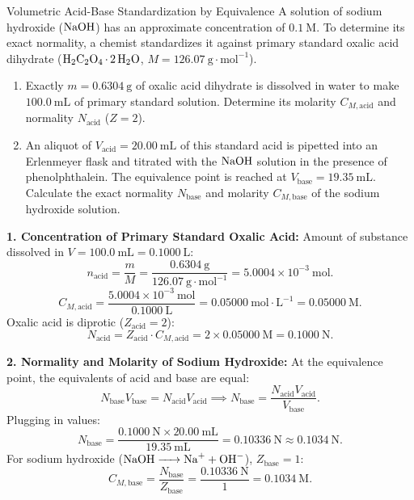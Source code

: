 \begin{exercise}{Volumetric Acid-Base Standardization by Equivalence}
A solution of sodium hydroxide ($\ce{NaOH}$) has an approximate concentration of $0.1\ \mathrm{M}$. To determine its exact normality, a chemist standardizes it against primary standard oxalic acid dihydrate ($\ce{H2C2O4*2H2O}$, $M = 126.07\ \mathrm{g\cdot mol^{-1}}$).
\begin{enumerate}[leftmargin=1.5em,itemsep=2pt]
  \item Exactly $m = 0.6304\ \mathrm{g}$ of oxalic acid dihydrate is dissolved in water to make $100.0\ \mathrm{mL}$ of primary standard solution. Determine its molarity $C_{M,\text{acid}}$ and normality $N_{\text{acid}}$ ($Z=2$).
  \item An aliquot of $V_{\text{acid}} = 20.00\ \mathrm{mL}$ of this standard acid is pipetted into an Erlenmeyer flask and titrated with the $\ce{NaOH}$ solution in the presence of phenolphthalein. The equivalence point is reached at $V_{\text{base}} = 19.35\ \mathrm{mL}$. Calculate the exact normality $N_{\text{base}}$ and molarity $C_{M,\text{base}}$ of the sodium hydroxide solution.
\end{enumerate}
\end{exercise}

\begin{tabletworkspace}[5.0cm]
\end{tabletworkspace}

\begin{solution}
\textbf{1. Concentration of Primary Standard Oxalic Acid:}
Amount of substance dissolved in $V = 100.0\ \mathrm{mL} = 0.1000\ \mathrm{L}$:
\[
n_{\text{acid}} = \frac{m}{M} = \frac{0.6304\ \mathrm{g}}{126.07\ \mathrm{g\cdot mol^{-1}}} = 5.0004 \times 10^{-3}\ \mathrm{mol}.
\]
\[
C_{M,\text{acid}} = \frac{5.0004 \times 10^{-3}\ \mathrm{mol}}{0.1000\ \mathrm{L}} = \mathbf{0.05000\ \mathrm{mol\cdot L^{-1}} = 0.05000\ \mathrm{M}}.
\]
Oxalic acid is diprotic ($Z_{\text{acid}} = 2$):
\[
N_{\text{acid}} = Z_{\text{acid}} \cdot C_{M,\text{acid}} = 2 \times 0.05000\ \mathrm{M} = \mathbf{0.1000\ \mathrm{N}}.
\]

\textbf{2. Normality and Molarity of Sodium Hydroxide:}
At the equivalence point, the equivalents of acid and base are equal:
\[
N_{\text{base}} V_{\text{base}} = N_{\text{acid}} V_{\text{acid}} \implies N_{\text{base}} = \frac{N_{\text{acid}} V_{\text{acid}}}{V_{\text{base}}}.
\]
Plugging in values:
\[
N_{\text{base}} = \frac{0.1000\ \mathrm{N} \times 20.00\ \mathrm{mL}}{19.35\ \mathrm{mL}} = \mathbf{0.10336\ \mathrm{N} \approx 0.1034\ \mathrm{N}}.
\]
For sodium hydroxide ($\ce{NaOH -> Na+ + OH-}$), $Z_{\text{base}} = 1$:
\[
C_{M,\text{base}} = \frac{N_{\text{base}}}{Z_{\text{base}}} = \frac{0.10336\ \mathrm{N}}{1} = \mathbf{0.1034\ \mathrm{M}}.
\]
\end{solution}

